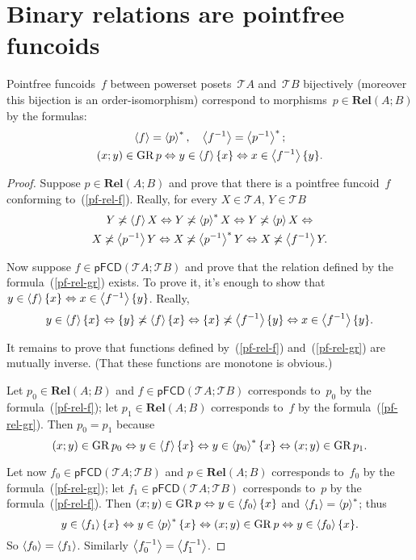 \section{Binary relations are pointfree funcoids}
\begin{thm}
\label{pf-rel}Pointfree funcoids~$f$ between powerset posets~$\mathscr{T}A$
and~$\mathscr{T}B$ bijectively (moreover this bijection is an order-isomorphism)
correspond to morphisms~$p\in\mathbf{Rel}(A;B)$ by the formulas:
\begin{gather}
\left\langle f\right\rangle=\left\langle p\right\rangle ^{\ast},\quad\left\langle f^{-1}\right\rangle=\left\langle p^{-1}\right\rangle ^{\ast};\label{pf-rel-f}\\
(x;y)\in\operatorname{GR} p\Leftrightarrow y\in\left\langle f\right\rangle\{x\}\Leftrightarrow x\in\left\langle f^{-1}\right\rangle\{y\}.\label{pf-rel-gr}
\end{gather}
\end{thm}
\begin{proof}
Suppose $p\in\mathbf{Rel}(A;B)$ and prove that there is a pointfree
funcoid~$f$ conforming to~(\ref{pf-rel-f}). Really, for every
$X\in\mathscr{T}A$, $Y\in\mathscr{T}B$ 
\begin{multline*}
Y\not\asymp\left\langle f\right\rangle X\Leftrightarrow Y\not\asymp\left\langle p\right\rangle ^{\ast}X\Leftrightarrow Y\not\asymp\left\langle p\right\rangle X\Leftrightarrow\\
X\not\asymp\left\langle p^{-1}\right\rangle Y\Leftrightarrow X\not\asymp\left\langle p^{-1}\right\rangle ^{\ast}Y\Leftrightarrow X\not\asymp\left\langle f^{-1}\right\rangle Y.
\end{multline*}


Now suppose $f\in\mathsf{pFCD}(\mathscr{T}A;\mathscr{T}B)$ and prove
that the relation defined by the formula~(\ref{pf-rel-gr}) exists.
To prove it, it's enough to show that $y\in\left\langle f\right\rangle\{x\}\Leftrightarrow x\in\left\langle f^{-1}\right\rangle\{y\}$.
Really, 
\[
y\in\left\langle f\right\rangle\{x\}\Leftrightarrow\{y\}\not\asymp\left\langle f\right\rangle\{x\}\Leftrightarrow\{x\}\not\asymp\left\langle f^{-1}\right\rangle\{y\}\Leftrightarrow x\in\left\langle f^{-1}\right\rangle\{y\}.
\]


It remains to prove that functions defined by~(\ref{pf-rel-f}) and~(\ref{pf-rel-gr})
are mutually inverse. (That these functions are monotone is obvious.)

Let $p_{0}\in\mathbf{Rel}(A;B)$ and $f\in\mathsf{pFCD}(\mathscr{T}A;\mathscr{T}B)$
corresponds to~$p_{0}$ by the formula~(\ref{pf-rel-f}); let $p_{1}\in\mathbf{Rel}(A;B)$
corresponds to~$f$ by the formula~(\ref{pf-rel-gr}). Then $p_{0}=p_{1}$
because 
\[
(x;y)\in\operatorname{GR} p_{0}\Leftrightarrow y\in\left\langle f\right\rangle\{x\}\Leftrightarrow y\in\left\langle p_{0}\right\rangle ^{\ast}\{x\}\Leftrightarrow(x;y)\in\operatorname{GR} p_{1}.
\]


Let now $f_{0}\in\mathsf{pFCD}(\mathscr{T}A;\mathscr{T}B)$ and $p\in\mathbf{Rel}(A;B)$
corresponds to~$f_{0}$ by the formula~(\ref{pf-rel-gr}); let $f_{1}\in\mathsf{pFCD}(\mathscr{T}A;\mathscr{T}B)$
corresponds to~$p$ by the formula~(\ref{pf-rel-f}). Then $(x;y)\in\operatorname{GR} p\Leftrightarrow y\in\left\langle f_{0}\right\rangle\{x\}$
and $\left\langle f_{1}\right\rangle=\left\langle p\right\rangle ^{\ast}$; thus 
\[
y\in\left\langle f_{1}\right\rangle\{x\}\Leftrightarrow y\in\left\langle p\right\rangle ^{\ast}\{x\}\Leftrightarrow(x;y)\in\operatorname{GR} p\Leftrightarrow y\in\left\langle f_{0}\right\rangle\{x\}.
\]
So $\left\langle f_{0}\right\rangle=\left\langle f_{1}\right\rangle$. Similarly $\left\langle f_{0}^{-1}\right\rangle=\left\langle f_{1}^{-1}\right\rangle$.\end{proof}
